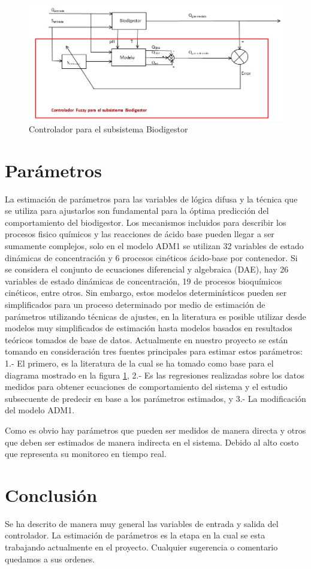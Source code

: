 \documentclass[12pt,letterpaper,twoside]{book}
\begin{document}
\begin{figure}
\centering
\includegraphics[width=6.5in]{controladorBio.jpg}
\caption{Controlador para el subsistema Biodigestor}
\label{fig002}
\end{figure}

\section{Parámetros}


La estimación de parámetros para las variables de lógica difusa y la técnica que se utiliza para ajustarlos son fundamental para la óptima predicción del comportamiento del biodigestor. Los mecanismos incluidos para describir los procesos fisico químicos y las reacciones de ácido base pueden llegar a ser sumamente complejos, solo en el modelo ADM1 se utilizan 32 variables de estado dinámicas de concentración y 6 procesos cinéticos ácido-base por contenedor. Si se considera el conjunto de ecuaciones diferencial y algebraica (DAE), hay 26 variables de estado dinámicas de concentración, 19 de procesos bioquímicos cinéticos, entre otros. Sin embargo, estos modelos determinísticos pueden ser simplificados para un proceso determinado por medio de estimación de parámetros utilizando técnicas de ajustes, en la literatura es posible utilizar desde modelos muy simplificados de estimación hasta modelos basados en resultados teóricos tomados de base de datos. Actualmente en nuestro proyecto se están tomando en consideración tres fuentes principales para estimar estos parámetros: 1.- El primero, es la literatura de la cual se ha tomado como base para el diagrama mostrado en la figura \ref{fig002}, 2.- Es las regresiones realizadas sobre los datos medidos para obtener ecuaciones de comportamiento del sistema y el estudio subsecuente de predecir en base a los parámetros estimados, y 3.- La modificación del modelo ADM1.

Como es obvio hay parámetros que pueden ser medidos de manera directa y otros que deben ser estimados de manera indirecta en el sistema. Debido al alto costo que representa su monitoreo en tiempo real.

\section{Conclusión}
Se ha descrito de manera muy general las variables de entrada y salida del controlador. La estimación de parámetros es la etapa en la cual se esta trabajando actualmente en el proyecto. Cualquier sugerencia o comentario quedamos a sus ordenes.


\backmatter
\end{document}
